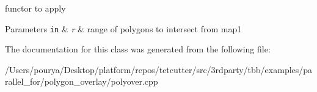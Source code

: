 functor to apply 


\begin{DoxyParams}[1]{Parameters}
\mbox{\tt in}  & {\em r} & range of polygons to intersect from map1 \\
\hline
\end{DoxyParams}


The documentation for this class was generated from the following file\+:\begin{DoxyCompactItemize}
\item 
/\+Users/pourya/\+Desktop/platform/repos/tetcutter/src/3rdparty/tbb/examples/parallel\+\_\+for/polygon\+\_\+overlay/polyover.\+cpp\end{DoxyCompactItemize}
